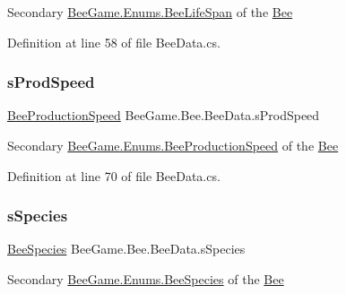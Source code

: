 Secondary \hyperlink{namespace_bee_game_1_1_enums_ae3853807ded2f4d99a0d4a7fb4b2bc46}{Bee\+Game.\+Enums.\+Bee\+Life\+Span} of the \hyperlink{namespace_bee_game_1_1_bee}{Bee} 



Definition at line 58 of file Bee\+Data.\+cs.

\mbox{\label{struct_bee_game_1_1_bee_1_1_bee_data_af2e94ee206fd06b8314888f8ba3d56e9}} 
\subsubsection{\texorpdfstring{s\+Prod\+Speed}{sProdSpeed}}
{\footnotesize\ttfamily \hyperlink{namespace_bee_game_1_1_enums_afee18200a21cc4b8e1d0cdb669930f14}{Bee\+Production\+Speed} Bee\+Game.\+Bee.\+Bee\+Data.\+s\+Prod\+Speed}



Secondary \hyperlink{namespace_bee_game_1_1_enums_afee18200a21cc4b8e1d0cdb669930f14}{Bee\+Game.\+Enums.\+Bee\+Production\+Speed} of the \hyperlink{namespace_bee_game_1_1_bee}{Bee} 



Definition at line 70 of file Bee\+Data.\+cs.

\mbox{\label{struct_bee_game_1_1_bee_1_1_bee_data_add33b8a3084a342ad7176a9366c2fc55}} 
\subsubsection{\texorpdfstring{s\+Species}{sSpecies}}
{\footnotesize\ttfamily \hyperlink{namespace_bee_game_1_1_enums_aa2ead984825678d83c42d48f6382619c}{Bee\+Species} Bee\+Game.\+Bee.\+Bee\+Data.\+s\+Species}



Secondary \hyperlink{namespace_bee_game_1_1_enums_aa2ead984825678d83c42d48f6382619c}{Bee\+Game.\+Enums.\+Bee\+Species} of the \hyperlink{namespace_bee_game_1_1_bee}{Bee} 



